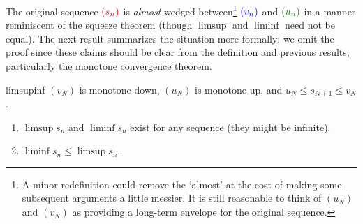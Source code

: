 The original sequence $\textcolor{red}{(s_n)}$ is \emph{almost} wedged between\footnote{%
	A minor redefinition could remove the `almost' at the cost of making some subsequent arguments a little messier. It is still reasonable to think of $(u_N)$ and $(v_N)$ as providing a long-term envelope for the original sequence.%
}
$\textcolor{blue}{(v_n)}$ and $\textcolor{Green}{(u_n)}$ in a manner reminiscent of the squeeze theorem (though $\limsup$ and $\liminf$ need not be equal). The next result summarizes the situation more formally; we omit the proof since these claims should be clear from the definition and previous results, particularly the monotone convergence theorem.


\begin{lemm}{}{limsupinf}
	\exstart $(v_N)$ is monotone-down, $(u_N)$ is monotone-up, and $u_N\le s_{N+1}\le v_N$.
	\begin{enumerate}\itemsep2pt\setcounter{enumi}{1}
	  \item\label{lemm:limsupinf1} $\limsup s_n$ and $\liminf s_n$ exist for any sequence (they might be infinite).
	  \item $\liminf s_n\le\limsup s_n$.
	\end{enumerate}
\end{lemm}





